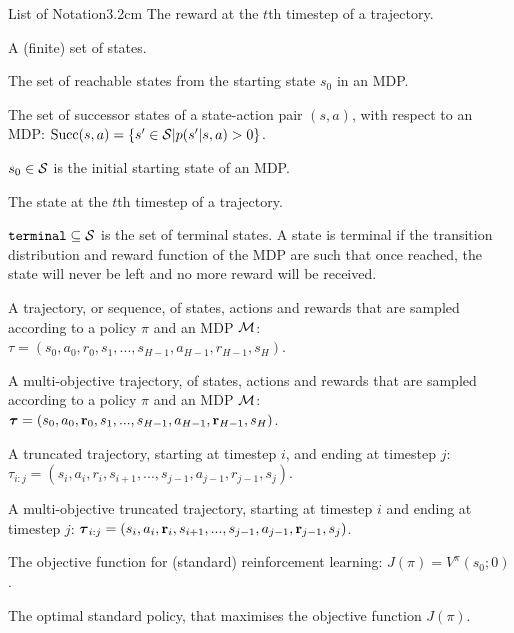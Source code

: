 \begin{mclistof}{List of Notation}{3.2cm}
        The reward at the $t$th timestep of a trajectory.
    \item[$\cl{S}$]
        A (finite) set of states.
    \item[$\cl{S}_0$]
        The set of reachable states from the starting state $s_0$ in an MDP.
    \item[$\suc{s}{a}$]
        The set of successor states of a state-action pair $(s,a)$, with respect to an MDP: ${\textnormal{Succ}(s,a)}=\{s'\in\mathcal{S}|p(s'|s,a)>0\}$.
    \item[$s_0$]
        $s_0\in\mathcal{S}$ is the initial starting state of an MDP.
    \item[$s_t$]
        The state at the $t$th timestep of a trajectory.
    \item[$\terminal$]
        ${\textnormal{\texttt{terminal}}}\subseteq\mathcal{S}$ is the set of terminal states. A state is terminal if the transition distribution and reward function of the MDP are such that once reached, the state will never be left and no more reward will be received.
    \item[$\tau$]
        A trajectory, or sequence, of states, actions and rewards that are sampled according to a policy $\pi$ and an MDP $\mathcal{M}$: $\tau = (s_0, a_0, r_0, s_1, ..., s_{H-1}, a_{H-1}, r_{H-1}, s_H)$.
    \item[$\bfg{\tau}$]
        A multi-objective trajectory, of states, actions and rewards that are sampled according to a policy $\pi$ and an MDP $\mathcal{M}$: $\boldsymbol{\tau} = (s_0, a_0, \mathbf{r}_0, s_1, ..., s_{H-1}, a_{H-1}, \mathbf{r}_{H-1}, s_H)$.
    \item[$\tau_{i:j}$]
        A truncated trajectory, starting at timestep $i$, and ending at timestep $j$: $\tau_{i:j} = (s_i, a_i, r_i, s_{i+1}, ..., s_{j-1}, a_{j-1}, r_{j-1}, s_j)$. 
    \item[$\bfg{\tau}_{i:j}$] 
        A multi-objective truncated trajectory, starting at timestep $i$ and ending at timestep $j$: $\boldsymbol{\tau}_{i:j} = (s_i, a_i, \mathbf{r}_i, s_{i+1}, ..., s_{j-1}, a_{j-1}, \mathbf{r}_{j-1}, s_j)$. %
    \\
    \item[$J(\pi)$] 
        The objective function for (standard) reinforcement learning: $J(\pi) = V^{\pi}(s_0;0)$.
    \item[$\pi^*$]
        The optimal standard policy, that maximises the objective function $J(\pi)$.
    \item[$Q^*$]

\end{mclistof}
